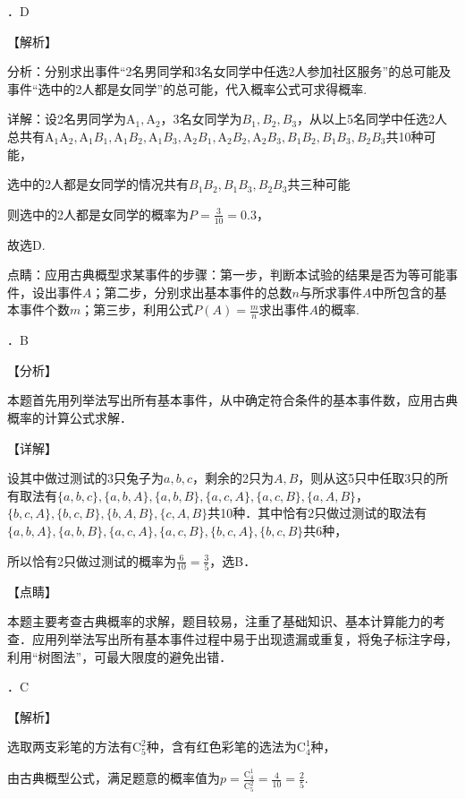 ．D

\noindent 【解析】

\noindent 分析：分别求出事件``2名男同学和3名女同学中任选2人参加社区服务''的总可能及事件``选中的2人都是女同学''的总可能，代入概率公式可求得概率.

\noindent 详解：设2名男同学为$\mathrm A_{1} ,\mathrm A_{2} $，3名女同学为$B_{1} ,B_{2} ,B_{3} $，从以上5名同学中任选2人总共有$\mathrm A_{1} \mathrm A_{2} ,\mathrm A_{1} B_{1} ,\mathrm A_{1} B_{2} ,\mathrm A_{1} B_{3} ,\mathrm A_{2} B_{1} ,\mathrm A_{2} B_{2} ,\mathrm A_{2} B_{3} ,B_{1} B_{2} ,B_{1} B_{3} ,B_{2} B_{3} $共10种可能，

\noindent 选中的2人都是女同学的情况共有$B_{1} B_{2} ,B_{1} B_{3} ,B_{2} B_{3} $共三种可能

则选中的2人都是女同学的概率为$P=\frac{3}{10} =0.3$，

故选D.

\noindent 点睛：应用古典概型求某事件的步骤：第一步，判断本试验的结果是否为等可能事件，设出事件$A$；第二步，分别求出基本事件的总数$n$与所求事件$A$中所包含的基本事件个数$m$；第三步，利用公式$P(A)=\frac{m}{n} $求出事件$A$的概率.

．B

\noindent 【分析】

\noindent 本题首先用列举法写出所有基本事件，从中确定符合条件的基本事件数，应用古典概率的计算公式求解．

\noindent 【详解】

\noindent 设其中做过测试的3只兔子为$a,b,c$，剩余的2只为$A,B$，则从这5只中任取3只的所有取法有$\{ a,b,c\} ,\{ a,b,A\} ,\{ a,b,B\} ,\{ a,c,A\} ,\{ a,c,B\} ,\{ a,A,B\} $，$\{ b,c,A\} ,\{ b,c,B\} ,\{ b,A,B\} ,\{ c,A,B\} $共10种．其中恰有2只做过测试的取法有$\{ a,b,A\} ,\{ a,b,B\} ,\{ a,c,A\} ,\{ a,c,B\} ,$$\{ b,c,A\} ,\{ b,c,B\} $共6种，

\noindent 所以恰有2只做过测试的概率为$\frac{6}{10} =\frac{3}{5} $，选B．

\noindent 【点睛】

\noindent 本题主要考查古典概率的求解，题目较易，注重了基础知识、基本计算能力的考查．应用列举法写出所有基本事件过程中易于出现遗漏或重复，将兔子标注字母，利用``树图法''，可最大限度的避免出错．

．C

\noindent 【解析】

\noindent 选取两支彩笔的方法有$\mathrm C_{5}^{2} $种，含有红色彩笔的选法为$\mathrm C_{4}^{1} $种，

\noindent 由古典概型公式，满足题意的概率值为$p=\frac{\mathrm C_{4}^{1} }{\mathrm C_{5}^{2} } =\frac{4}{10} =\frac{2}{5} $.

